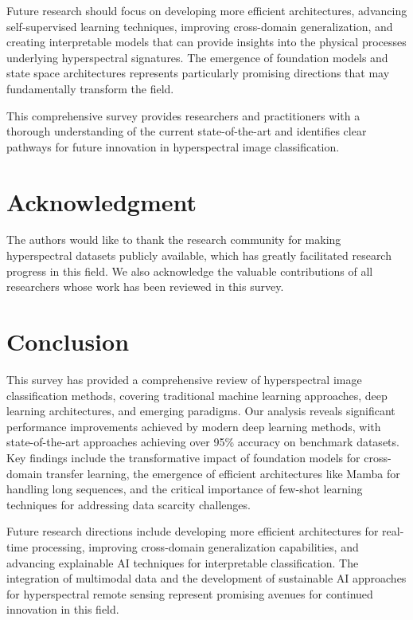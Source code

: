\documentclass[journal]{IEEEtran}
\begin{document}
Future research should focus on developing more efficient architectures, advancing self-supervised learning techniques, improving cross-domain generalization, and creating interpretable models that can provide insights into the physical processes underlying hyperspectral signatures. The emergence of foundation models and state space architectures represents particularly promising directions that may fundamentally transform the field.

This comprehensive survey provides researchers and practitioners with a thorough understanding of the current state-of-the-art and identifies clear pathways for future innovation in hyperspectral image classification.

\section*{Acknowledgment}

The authors would like to thank the research community for making hyperspectral datasets publicly available, which has greatly facilitated research progress in this field. We also acknowledge the valuable contributions of all researchers whose work has been reviewed in this survey.

\section{Conclusion}

This survey has provided a comprehensive review of hyperspectral image classification methods, covering traditional machine learning approaches, deep learning architectures, and emerging paradigms. Our analysis reveals significant performance improvements achieved by modern deep learning methods, with state-of-the-art approaches achieving over 95\% accuracy on benchmark datasets. Key findings include the transformative impact of foundation models for cross-domain transfer learning, the emergence of efficient architectures like Mamba for handling long sequences, and the critical importance of few-shot learning techniques for addressing data scarcity challenges.

Future research directions include developing more efficient architectures for real-time processing, improving cross-domain generalization capabilities, and advancing explainable AI techniques for interpretable classification. The integration of multimodal data and the development of sustainable AI approaches for hyperspectral remote sensing represent promising avenues for continued innovation in this field.



\end{document}
